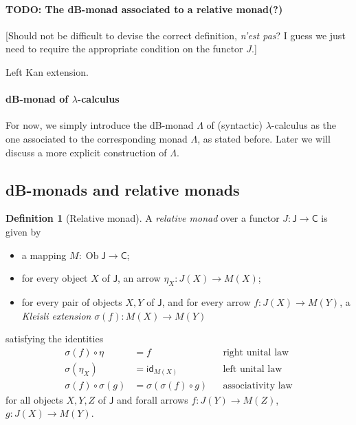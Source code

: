 \documentclass[a4paper,twoside,12pt]{article}
\theoremstyle{definition}
\newtheorem{definition}{Definition}
\theoremstyle{remark}
\DeclareMathOperator{\Ob}{Ob}
\begin{document}
\paragraph{TODO: The dB-monad associated to a relative monad(?)}

[Should not be difficult to devise the correct definition, \emph{n'est
  pas}?  I guess we just need to require the appropriate condition on
the functor $J$.]

Left Kan extension.

\paragraph{dB-monad of $\lambda$-calculus}

For now, we simply introduce the dB-monad $\mathsf{\Lambda}$ of
(syntactic) $\lambda$-calculus as the one associated to the
corresponding monad $\Lambda$, as stated before.  Later we will
discuss a more explicit construction of $\mathtt{\Lambda}$.

\subsection{dB-monads and relative monads}
\label{sec:subst-rel-monads}

\begin{definition}[Relative monad]
  A \emph{relative monad} over a functor
  $J\colon \mathsf{J}\to \mathsf{C}$ is given by
  \begin{itemize}
  \item a mapping $M:\Ob \mathsf{J} \to \mathsf{C}$;
  \item for every object $X$ of $\mathsf{J}$, an arrow $\eta_X\colon
    J(X) \to M(X)$;
  \item for every pair of objects $X,Y$ of $\mathsf{J}$, and for every
    arrow $f\colon J(X) \to M(Y)$, a \emph{Kleisli extension}
    $\sigma(f) \colon M(X) \to M(Y)$
  \end{itemize}
  satisfying the identities
  \begin{align*}
    \sigma(f) \circ \eta &= f &&\text{right unital law} \\
    \sigma(\eta_X) &= \mathsf{id}_{M(X)} &&\text{left unital law} \\
    \sigma(f) \circ \sigma(g) &= \sigma(\sigma(f) \circ g) &&\text{associativity law}
  \end{align*}
  for all objects $X,Y,Z$ of $\mathsf{J}$ and forall arrows
  $f\colon J(Y)\to M(Z)$, $g\colon J(X)\to M(Y)$.
\end{definition}
\end{document}
